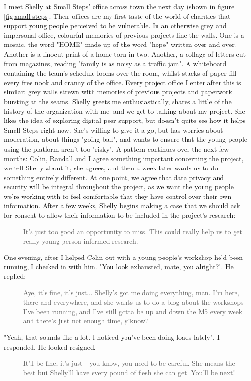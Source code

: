 I meet Shelly at Small Steps' office across town the next day (shown in figure \ref{fig:small-steps}. Their offices are my first taste of the world of charities that support young people perceived to be vulnerable. In an otherwise grey and impersonal office, colourful memories of previous projects line the walls. One is a mosaic, the word "HOME" made up of the word "hope" written over and over. Another is a linocut print of a home torn in two. Another, a collage of letters cut from magazines, reading "family is as noisy as a traffic jam". A whiteboard containing the team's schedule looms over the room, whilst stacks of paper fill every free nook and cranny of the office. Every project office I enter after this is similar: grey walls strewn with memories of previous projects and paperwork bursting at the seams. Shelly greets me enthusiastically, shares a little of the history of the organization with me, and we get to talking about my project. She likes the idea of exploring digital peer support, but doesn't quite see how it helps Small Steps right now. She's willing to give it a go, but has worries about moderation, about things "going bad", and wants to ensure that the young people using the platform aren't too "risky". A pattern continues over the next few months: Colin, Randall and I agree something important concerning the project, we tell Shelly about it, she agrees, and then a week later wants us to do something entirely different. At one point, we agree that data privacy and security will be integral throughout the project, as we want the young people we're working with to feel comfortable that they have control over their own information. After a few weeks, Shelly begins making a case that we should ask for consent to allow their information to be included in the project's research:
\begin{quote}
It's just too good an opportunity to miss. This could really help us to get really young-person informed research.
\end{quote}
One evening, after I helped Colin out with a young people's workshop he'd been running, I checked in with him. "You look exhausted, mate, you alright?". He replied:
\begin{quote}
Aye, it's fine, it's just... Shelly's got me doing everything, man. I'm here, there and everywhere, and she wants us to do a blog about the workshops I've been running, and I've still gotta be up and down the M5 every week and there's just not enough time, y'know?
\end{quote}
"Yeah, that sounds like a lot. I noticed you've been doing loads lately", I responded. He looked resigned.
\begin{quote}
It'll be fine, it's just - you know, you need to be careful. She means the best but Shelly'll have every pound of flesh she can get. You'll be next!    
\end{quote}

